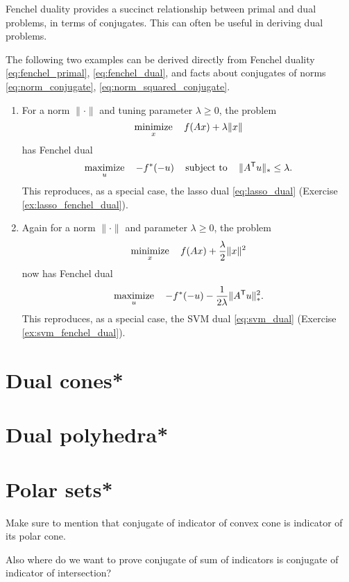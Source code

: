 Fenchel duality provides a succinct relationship between primal and dual
problems, in terms of conjugates. This can often be useful in deriving dual
problems.

\begin{Example}
The following two examples can be derived directly from Fenchel duality
\eqref{eq:fenchel_primal}, \eqref{eq:fenchel_dual}, and facts about conjugates
of norms \eqref{eq:norm_conjugate}, \eqref{eq:norm_squared_conjugate}.

\begin{enumerate}[label=\alph*., ref=\alph*]
\item {}
For a norm $\|\cdot\|$ and tuning parameter $\lambda \geq 0$, the problem    
\[
\operatorname*{minimize}_x \quad f(Ax) + \lambda \|x\| 
\]
has Fenchel dual 
\[
\operatorname*{maximize}_u \quad -f^*(-u) \quad \operatorname{subject\,\,to} \quad \|A^{\mathsf{T}} u\|_* \leq \lambda.        
\]
This reproduces, as a special case, the lasso dual \eqref{eq:lasso_dual} (Exercise
\ref{ex:lasso_fenchel_dual}). 

\item {}
Again for a norm $\|\cdot\|$ and parameter $\lambda \geq 0$, the problem   
\[
\operatorname*{minimize}_x \quad f(Ax) + \frac{\lambda}{2} \|x\|^2
\]
now has Fenchel dual 
\[
\operatorname*{maximize}_u \quad -f^*(-u) - \frac{1}{2\lambda} \|A^{\mathsf{T}} u\|_*^2. 
\]
This reproduces, as a special case, the SVM dual \eqref{eq:svm_dual} (Exercise
\ref{ex:svm_fenchel_dual}). 
\end{enumerate}
\end{Example}

\section{Dual cones*}
\label{sec:dual_cones}

\section{Dual polyhedra*}
\label{sec:dual_polyhedra}

\section{Polar sets*}
\label{sec:polar_sets}

Make sure to mention that conjugate of indicator of convex cone is indicator of
its polar cone. 

Also where do we want to prove conjugate of sum of indicators is conjugate of
indicator of intersection?

